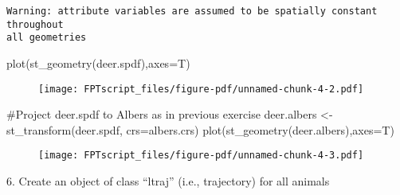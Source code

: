 \documentclass[
  letterpaper,
]{book}
\newenvironment{Shaded}{\begin{snugshade}}{\end{snugshade}}
\newcommand{\AttributeTok}[1]{\textcolor[rgb]{0.40,0.45,0.13}{#1}}
\newcommand{\CommentTok}[1]{\textcolor[rgb]{0.37,0.37,0.37}{#1}}
\newcommand{\FunctionTok}[1]{\textcolor[rgb]{0.28,0.35,0.67}{#1}}
\newcommand{\NormalTok}[1]{\textcolor[rgb]{0.00,0.23,0.31}{#1}}
\newcommand{\OtherTok}[1]{\textcolor[rgb]{0.00,0.23,0.31}{#1}}
\newcommand{\SpecialCharTok}[1]{\textcolor[rgb]{0.37,0.37,0.37}{#1}}
\begin{document}
\begin{verbatim}
Warning: attribute variables are assumed to be spatially constant throughout
all geometries
\end{verbatim}

\begin{Shaded}
\begin{Highlighting}[]
\FunctionTok{plot}\NormalTok{(}\FunctionTok{st\_geometry}\NormalTok{(deer.spdf),}\AttributeTok{axes=}\NormalTok{T)}
\end{Highlighting}
\end{Shaded}

\begin{figure}[H]

{\centering \texttt{[image: FPTscript\_files/figure-pdf/unnamed-chunk-4-2.pdf]}

}

\end{figure}

\begin{Shaded}
\begin{Highlighting}[]
\CommentTok{\#Project deer.spdf to Albers as in previous exercise}
\NormalTok{deer.albers }\OtherTok{\textless{}{-}}\FunctionTok{st\_transform}\NormalTok{(deer.spdf, }\AttributeTok{crs=}\NormalTok{albers.crs)}
\FunctionTok{plot}\NormalTok{(}\FunctionTok{st\_geometry}\NormalTok{(deer.albers),}\AttributeTok{axes=}\NormalTok{T)}
\end{Highlighting}
\end{Shaded}

\begin{figure}[H]

{\centering \texttt{[image: FPTscript\_files/figure-pdf/unnamed-chunk-4-3.pdf]}

}

\end{figure}

6. Create an object of class ``ltraj'' (i.e., trajectory) for all
animals

\begin{Shaded}
\end{Shaded}
\end{document}
